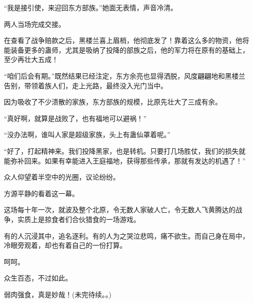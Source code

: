 \begin{this_body}
“我是接引使，来迎回东方部族。”她面无表情，声音冷清。

两人当场完成交接。

在查看了战争赔款之后，黑楼兰喜上眉梢，他彻底发了！靠着这么多的物资，他将能装备更多的蛊师，尤其是吸纳了投降的部族之后，他的军力将在原有的基础上，至少再壮大五成！

“咱们后会有期。”既然结果已经注定，东方余亮也显得洒脱，风度翩翩地和黑楼兰告别，带领着族人们，走上光路，最终没入光门当中。

因为吸收了不少溃散的家族，东方部族的规模，比原先壮大了三成有余。

“真好啊，就算是战败了，也有福地可以避祸！”

“没办法啊，谁叫人家是超级家族，头上有蛊仙罩着呢。”

“好了，打起精神来。我们投降黑家，也是转机。只要打几场胜仗，我们的损失就能弥补回来。如果有幸能进入王庭福地，获得那些传承，那就有发达的机遇了！”

众人仰望着半空中的光圈，议论纷纷。

方源平静的看着这一幕。

这场每十年一次，就波及整个北原，令无数人家破人亡，令无数人飞黄腾达的战争，实质上是掠食者们合伙猎食的一场游戏。

有的人沉浸其中，追名逐利。有的人为之哭泣悲鸣，痛不欲生。而自己身在局中，冷眼旁观着，却也有着自己的一份打算。

呵呵。

众生百态，不过如此。

弱肉强食，真是妙哉！(未完待续。。)

\end{this_body}

